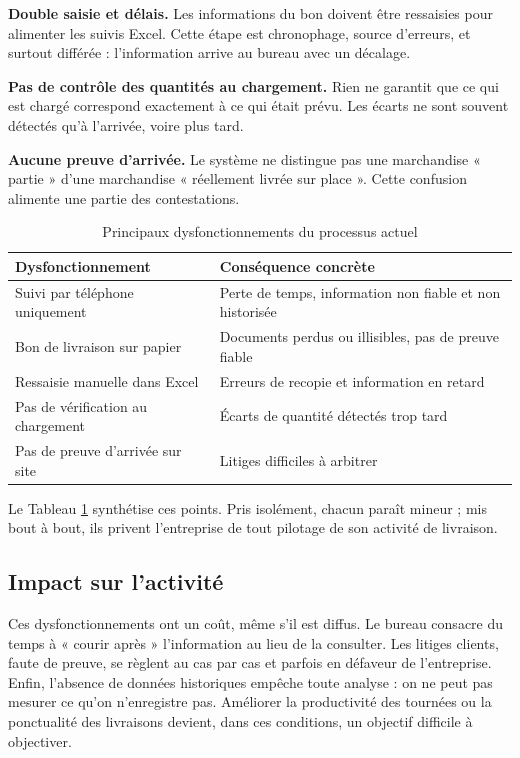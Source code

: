 \documentclass[12pt,a4paper]{report}
\begin{document}
\textbf{Double saisie et délais.} Les informations du bon doivent être ressaisies pour alimenter les suivis Excel. Cette étape est chronophage, source d'erreurs, et surtout différée : l'information arrive au bureau avec un décalage.

\textbf{Pas de contrôle des quantités au chargement.} Rien ne garantit que ce qui est chargé correspond exactement à ce qui était prévu. Les écarts ne sont souvent détectés qu'à l'arrivée, voire plus tard.

\textbf{Aucune preuve d'arrivée.} Le système ne distingue pas une marchandise « partie » d'une marchandise « réellement livrée sur place ». Cette confusion alimente une partie des contestations.

\begin{table}[htbp]
\centering
\caption{Principaux dysfonctionnements du processus actuel}
\label{tab:dysfonctionnements}
\begin{tabular}{|p{5.5cm}|p{8cm}|}
\hline
\textbf{Dysfonctionnement} & \textbf{Conséquence concrète} \\
\hline
Suivi par téléphone uniquement & Perte de temps, information non fiable et non historisée \\
\hline
Bon de livraison sur papier & Documents perdus ou illisibles, pas de preuve fiable \\
\hline
Ressaisie manuelle dans Excel & Erreurs de recopie et information en retard \\
\hline
Pas de vérification au chargement & Écarts de quantité détectés trop tard \\
\hline
Pas de preuve d'arrivée sur site & Litiges difficiles à arbitrer \\
\hline
\end{tabular}
\end{table}

Le Tableau \ref{tab:dysfonctionnements} synthétise ces points. Pris isolément, chacun paraît mineur ; mis bout à bout, ils privent l'entreprise de tout pilotage de son activité de livraison.

\subsection{Impact sur l'activité}

Ces dysfonctionnements ont un coût, même s'il est diffus. Le bureau consacre du temps à « courir après » l'information au lieu de la consulter. Les litiges clients, faute de preuve, se règlent au cas par cas et parfois en défaveur de l'entreprise. Enfin, l'absence de données historiques empêche toute analyse : on ne peut pas mesurer ce qu'on n'enregistre pas. Améliorer la productivité des tournées ou la ponctualité des livraisons devient, dans ces conditions, un objectif difficile à objectiver.
\end{document}
